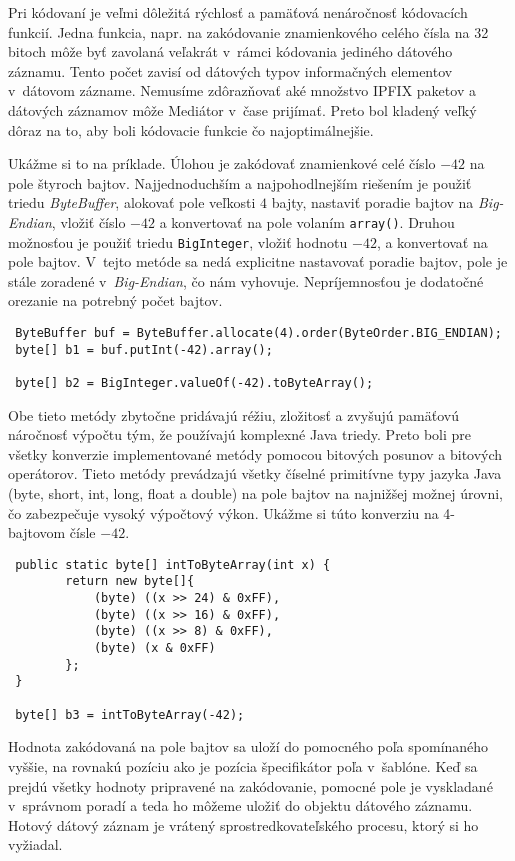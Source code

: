 Pri kódovaní je veľmi dôležitá rýchlosť a pamäťová 
nenáročnosť kódovacích funkcií. Jedna funkcia, napr. na zakódovanie znamienkového celého čísla na 32
bitoch môže byť zavolaná veľakrát v~rámci kódovania jediného dátového záznamu. Tento počet zavisí od 
dátových typov informačných elementov v~dátovom zázname. Nemusíme zdôrazňovať aké množstvo IPFIX paketov 
a dátových záznamov môže Mediátor v~čase prijímať. Preto bol kladený veľký dôraz na to, aby boli 
kódovacie funkcie čo najoptimálnejšie. 

Ukážme si to na príklade. Úlohou je zakódovať znamienkové celé číslo $-42$ na pole štyroch bajtov.
Najjednoduchším a najpohodlnejším riešením je použiť triedu \emph{ByteBuffer}, alokovať pole veľkosti 
$4$ bajty, nastaviť poradie bajtov na \emph{Big-Endian}, vložiť číslo $-42$ a konvertovať na pole 
volaním \verb|array()|. Druhou možnosťou je použiť triedu \verb|BigInteger|, vložiť hodnotu $-42$, 
a konvertovať na pole bajtov. V~tejto metóde sa nedá explicitne nastavovať poradie bajtov, pole 
je stále zoradené v~\emph{Big-Endian}, čo nám vyhovuje. Nepríjemnosťou je dodatočné orezanie na 
potrebný počet bajtov. 
\begin{verbatim}
 ByteBuffer buf = ByteBuffer.allocate(4).order(ByteOrder.BIG_ENDIAN);
 byte[] b1 = buf.putInt(-42).array();
 
 byte[] b2 = BigInteger.valueOf(-42).toByteArray();
\end{verbatim}
Obe tieto metódy zbytočne pridávajú réžiu, zložitosť a zvyšujú pamäťovú náročnosť výpočtu tým, že 
používajú komplexné Java triedy. Preto boli pre všetky konverzie implementované metódy pomocou bitových
posunov a bitových operátorov. Tieto metódy prevádzajú všetky číselné primitívne typy jazyka Java 
(byte, short, int, long, float a double) na pole bajtov na najnižšej možnej úrovni, čo zabezpečuje vysoký
výpočtový výkon. Ukážme si túto konverziu na 4-bajtovom čísle $-42$.
\begin{verbatim}
 public static byte[] intToByteArray(int x) {
        return new byte[]{
            (byte) ((x >> 24) & 0xFF),
            (byte) ((x >> 16) & 0xFF),
            (byte) ((x >> 8) & 0xFF),
            (byte) (x & 0xFF)
        };
 }
 
 byte[] b3 = intToByteArray(-42);
\end{verbatim}

Hodnota zakódovaná na pole bajtov sa uloží do pomocného poľa spomínaného vyššie, na rovnakú pozíciu
ako je pozícia špecifikátor poľa v~šablóne. Keď sa prejdú všetky hodnoty pripravené na zakódovanie, 
pomocné pole je vyskladané v~správnom poradí a teda ho môžeme uložiť do objektu dátového záznamu.
Hotový dátový záznam je vrátený sprostredkovateľského procesu, ktorý si ho vyžiadal.


